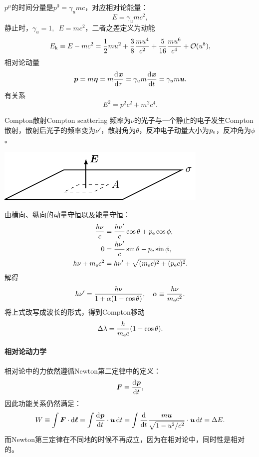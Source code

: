$p^\mu$的时间分量是$p^0=\gamma_umc$，对应相对论能量：
\[
    E=\gamma_umc^2,
\]
静止时，$\gamma_u=1,\enspace E=mc^2$，二者之差定义为动能
\[
    E_{\mathrm k}\equiv E-mc^2=\frac12mu^2+\frac38\frac{mu^4}{c^2}+\frac5{16}\frac{mu^6}{c^4}+\mathcal O(u^8),
\]
相对论动量
\[
    \bm p=m\bm\eta=m\frac{\mathrm{d}^{{}}\bm x}{\mathrm{d}{\tau}^{{}}}=\gamma_um\frac{\mathrm{d}^{{}}\bm x}{\mathrm{d}{t}^{{}}}=\gamma_um\bm u.
\]
有关系
\begin{equation}
    E^2=p^2c^2+m^2c^4.
\end{equation}
\begin{example}{Compton散射}{Compton scattering}
    频率为$\nu$的光子与一个静止的电子发生Compton散射，散射后光子的频率变为$\nu'$，散射角为$\theta$，反冲电子动量大小为$p_\mathrm e$，反冲角为$\phi$。
    \begin{center}
        \includegraphics[page=31]{figures/tikz/layouts.pdf}
    \end{center}
    由横向、纵向的动量守恒以及能量守恒：
    \begin{subequations}
        \begin{align}
            \frac{h\nu}c&=\frac{h\nu'}c\cos\theta+p_\mathrm e\cos\phi,\\
            0&=\frac{h\nu'}c\sin\theta-p_\mathrm e\sin\phi,\\
            h\nu+m_\mathrm e c^2&=h\nu'+\sqrt{(m_\mathrm e c)^2+(p_\mathrm e c)^2}.
        \end{align}
    \end{subequations}
    解得
    \begin{equation}
        h\nu'=\frac{h\nu}{1+\alpha(1-\cos\theta)},\quad\alpha\equiv\frac{h\nu}{m_\mathrm e c^2}.
    \end{equation}
    将上式改写成波长的形式，得到Compton移动
    \begin{equation}
        \Delta\lambda=\frac h{m_\mathrm e c}(1-\cos\theta).
    \end{equation}
\end{example}

\paragraph{相对论动力学}

相对论中的力依然遵循Newton第二定律中的定义：
\[
    \bm F\equiv\frac{\mathrm{d}^{{}}\bm p}{\mathrm{d}{t}^{{}}},
\]
因此功能关系仍然满足：
\begin{equation}
    W\equiv\int\bm F\cdot\mathop{}\!\mathrm{d}\bm\ell=\int\frac{\mathrm{d}^{{}}\bm p}{\mathrm{d}{t}^{{}}}\cdot\bm u\mathop{}\!\mathrm{d} t=\int\frac{\mathrm{d}^{{}}}{\mathrm{d}{t}^{{}}}\frac{m\bm u}{\sqrt{1-u^2/c^2}}\cdot\bm u\mathop{}\!\mathrm{d} t=\Delta E.
\end{equation}
而Newton第三定律在不同地的时候不再成立，因为在相对论中，同时性是相对的。


